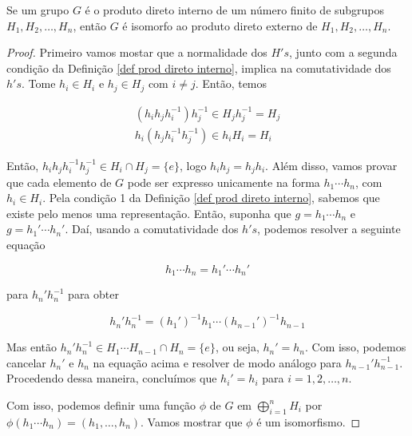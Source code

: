 	
	\begin{theorem}
		\label{isomorfismo entre interno e externo}
		Se um grupo $G$ é o produto direto interno de um número finito de subgrupos $H_1, H_2, \dots, H_n$, então $G$ é isomorfo ao produto direto externo de $H_1, H_2, \dots, H_n$.
	\end{theorem}
	
	\begin{proof}
		Primeiro vamos mostar que a normalidade dos $H's$, junto com a segunda condição da Definição \eqref{def prod direto interno}, implica na comutatividade dos $h's$. Tome $h_i\in H_i$ e $h_j\in H_j$ com $i\neq j$. Então, temos
		
		\begin{align*}
		(h_ih_jh_i^{-1})h_j^{-1} \in H_jh_j^{-1} = H_j \\
		h_i(h_jh_i^{-1}h_j^{-1}) \in h_iH_i = H_i
		\end{align*}
		\par\vspace{0.3cm} Então, $h_ih_jh_i^{-1}h_j^{-1}\in H_i\cap H_j = \{e\}$, logo $h_ih_j = h_jh_i$. Além disso, vamos provar que cada elemento de $G$ pode ser expresso unicamente na forma $h_1\cdots h_n$, com $h_i\in H_i$. Pela condição 1 da Definição \eqref{def prod direto interno}, sabemos que existe pelo menos uma representação. Então, suponha que $g = h_1\cdots h_n$ e $g = h_1'\cdots h_n'$. Daí, usando a comutatividade dos $h's$, podemos resolver a seguinte equação
		
		\begin{equation*}
		h_1\cdots h_n = h_1'\cdots h_n'
		\end{equation*}
		
		\par\vspace{0.3cm} para $h_n'h_n^{-1}$ para obter
		
		\begin{equation*}
		h_n'h_n^{-1} = (h_1')^{-1}h_1\cdots (h_{n-1}')^{-1}h_{n-1}
		\end{equation*}
		
		\par\vspace{0.3cm} Mas então $h_n'h_n^{-1}\in H_1\cdots H_{n-1}\cap H_n = \{e\}$, ou seja, $h_n' = h_n$. Com isso, podemos cancelar $h_n'$ e $h_n$ na equação acima e resolver de modo análogo para $h_{n-1}'h_{n-1}^{-1}$. Procedendo dessa maneira, concluímos que $h_i' = h_i$ para $i = 1, 2, \dots, n$.
		
		\par\vspace{0.3cm} Com isso, podemos definir uma função $\phi$ de $G$ em $\displaystyle{\bigoplus_{i = 1}^{n}H_i}$ por $\phi(h_1\cdots h_n) = (h_1, \dots, h_n)$. Vamos mostrar que $\phi$ é um isomorfismo.
		

\end{proof}
